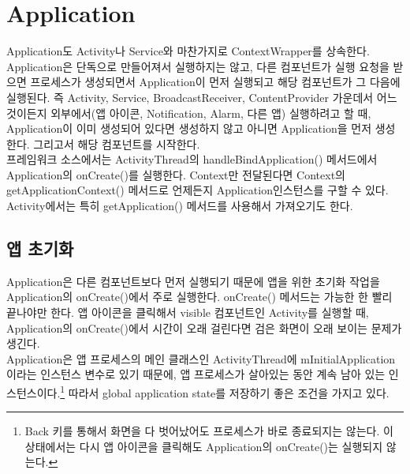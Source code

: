 \chapter{Application}
Application도 Activity나 Service와 마찬가지로 ContextWrapper를 상속한다.
Application은 단독으로 만들어져서 실행하지는 않고, 다른 컴포넌트가 실행 요청을 받으면 프로세스가 생성되면서 Application이 먼저 실행되고 해당 컴포넌트가 그 다음에 실행된다. 즉 Activity, Service, BroadcastReceiver, ContentProvider 가운데서 어느 것이든지 외부에서(앱 아이콘, Notification, Alarm, 다른 앱) 실행하려고 할 때, Application이 이미 생성되어 있다면 생성하지 않고 아니면 Application을 먼저 생성한다. 그리고서 해당 컴포넌트를 시작한다.\\

프레임워크 소스에서는 ActivityThread의 handleBindApplication() 메서드에서 Application의 onCreate()를 실행한다.
Context만 전달된다면 Context의 getApplicationContext() 메서드로 언제든지 Application인스턴스를 구할 수 있다. Activity에서는 특히 getApplication() 메서드를 사용해서 가져오기도 한다.

\section{앱 초기화}
Application은 다른 컴포넌트보다 먼저 실행되기 때문에 앱을 위한 초기화 작업을 Application의 onCreate()에서 주로 실행한다.
onCreate() 메서드는 가능한 한 빨리 끝나야만 한다. 앱 아이콘을 클릭해서 visible 컴포넌트인 Activity를 실행할 때, Application의 onCreate()에서 시간이 오래 걸린다면 검은 화면이 오래 보이는 문제가 생긴다.\\

Application은 앱 프로세스의 메인 클래스인 ActivityThread에 mInitialApplication이라는 인스턴스 변수로 있기 때문에, 앱 프로세스가 살아있는 동안 계속 남아 있는 인스턴스이다.\footnote{Back 키를 통해서 화면을 다 벗어났어도 프로세스가 바로 종료되지는 않는다. 이 상태에서는 다시 앱 아이콘을 클릭해도 Application의 onCreate()는 실행되지 않는다.}
따라서 global application state를 저장하기 좋은 조건을 가지고 있다.\\

